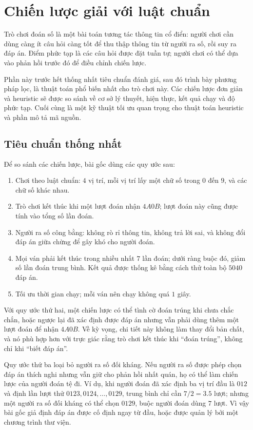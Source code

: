 \documentclass[11pt]{article}
\newcommand{\AB}[2]{#1A#2B}
\begin{document}
\section{Chiến lược giải với luật chuẩn}

Trò chơi đoán số là một bài toán tương tác thông tin cổ điển: người chơi cần
dùng càng ít câu hỏi càng tốt để thu thập thông tin từ người ra số, rồi suy ra
đáp án. Điểm phức tạp là các câu hỏi được đặt tuần tự; người chơi có thể dựa
vào phản hồi trước đó để điều chỉnh chiến lược.

Phần này trước hết thống nhất tiêu chuẩn đánh giá, sau đó trình bày phương
pháp lọc, là thuật toán phổ biến nhất cho trò chơi này. Các chiến lược đơn
giản và heuristic sẽ được so sánh về cơ sở lý thuyết, hiện thực, kết quả chạy
và độ phức tạp. Cuối cùng là một kỹ thuật tối ưu quan trọng cho thuật toán
heuristic và phần mô tả mã nguồn.

\subsection{Tiêu chuẩn thống nhất}

Để so sánh các chiến lược, bài gốc dùng các quy ước sau:
\begin{enumerate}
  \item Chơi theo luật chuẩn: \(4\) vị trí, mỗi vị trí lấy một chữ số trong
  \(0\) đến \(9\), và các chữ số khác nhau.
  \item Trò chơi kết thúc khi một lượt đoán nhận \(\AB{4}{0}\); lượt đoán này
  cũng được tính vào tổng số lần đoán.
  \item Người ra số công bằng: không rò rỉ thông tin, không trả lời sai, và
  không đổi đáp án giữa chừng để gây khó cho người đoán.
  \item Mọi ván phải kết thúc trong nhiều nhất \(7\) lần đoán; dưới ràng buộc
  đó, giảm số lần đoán trung bình. Kết quả được thống kê bằng cách thử toàn bộ
  \(5040\) đáp án.
  \item Tối ưu thời gian chạy; mỗi ván nên chạy không quá \(1\) giây.
\end{enumerate}

Với quy ước thứ hai, một chiến lược có thể tình cờ đoán trúng khi chưa chắc
chắn, hoặc ngược lại đã xác định được đáp án nhưng vẫn phải dùng thêm một lượt
đoán để nhận \(\AB{4}{0}\). Về kỳ vọng, chi tiết này không làm thay đổi bản
chất, và nó phù hợp hơn với trực giác rằng trò chơi kết thúc khi ``đoán
trúng'', không chỉ khi ``biết đáp án''.

Quy ước thứ ba loại bỏ người ra số đối kháng. Nếu người ra số được phép chọn
đáp án thích nghi nhưng vẫn giữ cho phản hồi nhất quán, họ có thể làm chiến
lược của người đoán tệ đi. Ví dụ, khi người đoán đã xác định ba vị trí đầu là
\(012\) và định lần lượt thử \(0123,0124,\ldots,0129\), trung bình chỉ cần
\(7/2=3.5\) lượt; nhưng một người ra số đối kháng có thể chọn \(0129\), buộc
người đoán dùng \(7\) lượt. Vì vậy bài gốc giả định đáp án được cố định ngay
từ đầu, hoặc được quản lý bởi một chương trình thư viện.
\end{document}
